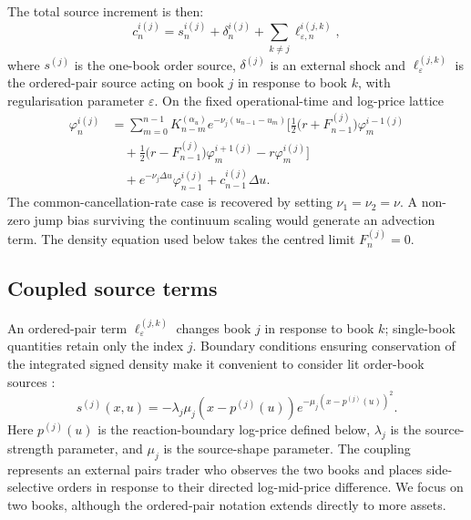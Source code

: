 \documentclass[5p,final]{elsarticle}
\begin{document}
The total source increment is then:
\begin{equation}
    c_n^{i(j)}
    =s_n^{i(j)}+\delta_n^{i(j)}
    +\sum_{k\ne j}\ell_{\varepsilon,n}^{i(j,k)},
    \label{eq:discrete-total-source}
\end{equation}
where $s^{(j)}$ is the one-book order source, $\delta^{(j)}$ is an external shock and $\ell_\varepsilon^{(j,k)}$ is the ordered-pair source acting on book $j$ in response to book $k$, with regularisation parameter $\varepsilon$. On the fixed operational-time and log-price lattice
\begin{equation}
\begin{aligned}
\varphi^{i(j)}_n
&= \sum_{m=0}^{n-1} K_{n-m}^{(\alpha_u)}
 e^{-\nu_j (u_{n-1}-u_m)} \bigg[
\tfrac{1}{2}\big(r + F^{(j)}_{n-1}\big)\varphi^{i-1(j)}_{m} \\
&\quad + \tfrac{1}{2}\big(r - F^{(j)}_{n-1}\big)\varphi^{i+1(j)}_{m}
- r \varphi^{i(j)}_{m}
\bigg] \\
&\quad + e^{-\nu_j\Delta u}\varphi^{i(j)}_{n-1}
+ c_{n-1}^{i(j)}\Delta u.
\end{aligned}
\label{eq:operational-DTRW-update}
\end{equation}
The common-cancellation-rate case is recovered by setting $\nu_1=\nu_2=\nu$. A non-zero jump bias surviving the continuum scaling would generate an advection term. The density equation used below takes the centred limit $F_n^{(j)}=0$.

\subsection{Coupled source terms} \label{ssec:coupledPDE}

An ordered-pair term $\ell_\varepsilon^{(j,k)}$ changes book $j$ in response to book $k$; single-book quantities retain only the index $j$. Boundary conditions ensuring conservation of the integrated signed density make it convenient to consider lit order-book sources \citep{Gant2022b,DianaGebbie2025,BauerDianaGebbie2024}:
\begin{equation}\label{eq:source-term}
s^{(j)}(x,u) = - \lambda_j \mu_j (x - p^{(j)}(u)) e^{-\mu_j\left(x - p^{(j)}(u)\right)^2}.
\end{equation}
Here $p^{(j)}(u)$ is the reaction-boundary log-price defined below, $\lambda_j$ is the source-strength parameter, and $\mu_j$ is the source-shape parameter. The coupling represents an external pairs trader who observes the two books and places side-selective orders in response to their directed log-mid-price difference. We focus on two books, although the ordered-pair notation extends directly to more assets.
\end{document}

